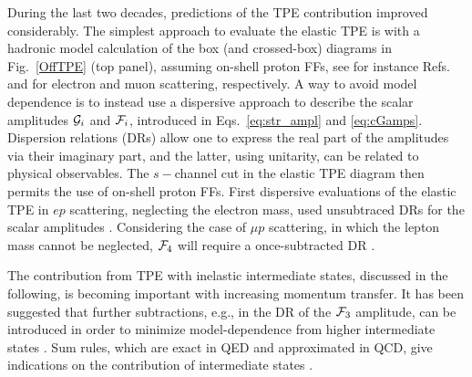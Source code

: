 During the last two decades,  predictions of the TPE contribution improved considerably. The simplest approach to evaluate the elastic TPE is with a hadronic model calculation of the box (and crossed-box) diagrams in Fig.~\ref{OffTPE} (top panel), assuming on-shell proton FFs, see for instance Refs.~\cite{Blunden:2003sp} and \cite{Tomalak:2014dja} for electron and muon scattering, respectively. A way to avoid model dependence is to instead use a dispersive approach to describe the scalar amplitudes ${\cal G}_i$ and ${\cal F}_i$, introduced in Eqs.~\ref{eq:str_ampl} and \ref{eq:cGamps}. 
Dispersion relations (DRs) allow one to express the real part of the amplitudes via their imaginary part, and the latter, using unitarity, can be related to physical observables. The $s-$channel cut in the elastic TPE diagram then permits the use of on-shell proton FFs. 
First dispersive evaluations of the elastic TPE in $ep$ scattering, neglecting the electron mass, used unsubtraced DRs for the scalar amplitudes \cite{Borisyuk:2006fh,Borisyuk:2008es}. Considering the case of $\mu p$ scattering, in which the lepton mass cannot be neglected, ${\cal F}_4$ will require a once-subtracted DR \cite{Tomalak:2018jak}.

The contribution from TPE with inelastic intermediate states, discussed in the following, is becoming important with increasing momentum transfer. It has been  suggested that further subtractions, e.g., in the DR of the ${\cal F}_3$ amplitude, can be introduced in order to minimize model-dependence from higher intermediate states \cite{Tomalak:2014sva}. Sum rules, which are exact in QED and approximated in QCD, give indications on the contribution of intermediate states \cite{Kuraev:2006ym}. 

